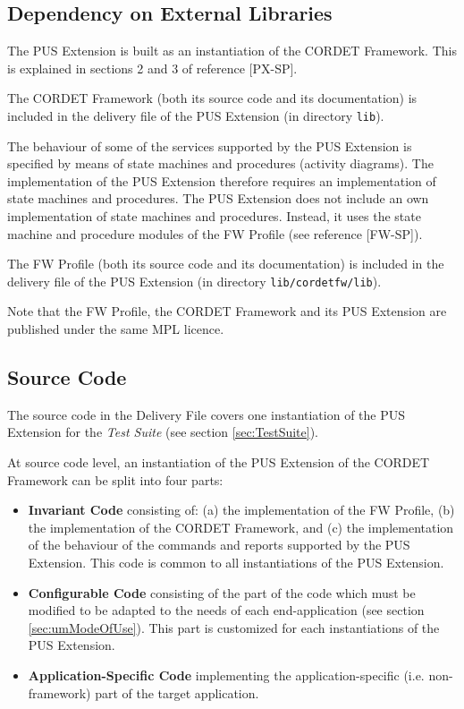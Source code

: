 \documentclass{pnp_article}
\begin{document}
\subsection{Dependency on External Libraries}\label{sec:depLib}
The PUS Extension is built as an instantiation of the CORDET Framework. This is explained in sections 2 and 3 of reference [PX-SP].

The CORDET Framework (both its source code and its documentation) is included in the delivery file of the PUS Extension (in directory \texttt{lib}). 

The behaviour of some of the services supported by the PUS Extension is specified by means of state machines and procedures (activity diagrams). The implementation of the PUS Extension therefore requires an implementation of state machines and procedures. The PUS Extension does not include an own implementation of state machines and procedures. Instead, it uses the state machine and procedure modules of the FW Profile (see reference [FW-SP]). 

The FW Profile (both its source code and its documentation) is included in the delivery file of the PUS Extension (in directory \texttt{lib/cordetfw/lib}). 

Note that the FW Profile, the CORDET Framework and its PUS Extension are published under the same MPL licence. 

\subsection{Source Code}\label{sec:fwSrcCode}
The source code in the Delivery File covers one instantiation of the PUS Extension for the \textit{Test Suite} (see section \ref{sec:TestSuite}). 

At source code level, an instantiation of the PUS Extension of the CORDET Framework can be split into four parts:

\begin{itemize}
\item \textbf{Invariant Code} consisting of: (a) the implementation of the FW Profile, (b) the implementation of the CORDET Framework, and (c)  the implementation of the behaviour of the commands and reports supported by the PUS Extension. This code is common to all instantiations of the PUS Extension. 
\item \textbf{Configurable Code} consisting of the part of the code which must be modified to be adapted to the needs of each end-application (see section \ref{sec:umModeOfUse}). This part is customized for each instantiations of the PUS Extension. 
\item \textbf{Application-Specific Code} implementing the application-specific (i.e. non-framework) part of the target application. 
\end{itemize}
\end{document}
